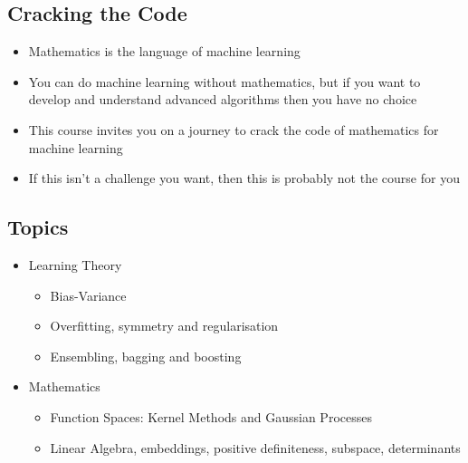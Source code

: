 
\begin{slide}
\section{Cracking the Code}

\begin{PauseHighLight}
  \begin{itemize}
  \item Mathematics is the language of machine learning\pause
  \item You can do machine learning without mathematics, but if you want
    to develop and understand advanced algorithms then you have no
    choice\pause
  \item This course invites you on a journey to crack the code of
    mathematics for machine learning\pause
  \item If this isn't a challenge you want, then this is probably not
    the course for you\pause
  \end{itemize}
\end{PauseHighLight}

\end{slide}


\begin{slide}
\section{Topics}

\begin{PauseHighLight}
  \begin{itemize}
  \item Learning Theory
    \begin{itemize}\squeeze
    \item Bias-Variance
    \item Overfitting, symmetry and regularisation
    \item Ensembling, bagging and boosting\pause
    \end{itemize}
  \item Mathematics
    \begin{itemize}\squeeze
    \item Function Spaces: Kernel Methods and Gaussian Processes
    \item Linear Algebra, embeddings, positive definiteness, subspace,
      determinants\pause
    \end{itemize}
  \end{itemize}
\end{PauseHighLight}

\end{slide}

